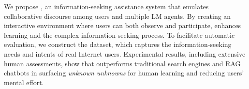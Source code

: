 We propose \system, an information-seeking assistance system that emulates collaborative discourse among users and multiple LM agents. By creating an interactive environment where users can both observe and participate, \system enhances learning and the complex information-seeking process. To facilitate automatic evaluation, we construct the \data dataset, which captures the information-seeking needs and intents of real Internet users. Experimental results, including extensive human assessments, show that \system outperforms traditional search engines and RAG chatbots in surfacing \textit{unknown unknowns} for human learning and reducing users' mental effort.%